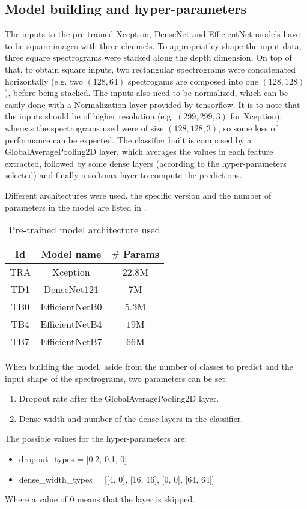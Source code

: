 \subsection{Model building and hyper-parameters}

The inputs to the pre-trained Xception, DenseNet and EfficientNet models have
to be square images with three channels.
To appropriatley shape the input data, three square spectrograms were stacked
along the depth dimension.
On top of that, to obtain square inputs, two rectangular spectrograms were
concatenated horizontally (e.g. two $\left( 128, 64 \right)$ spectrogams are
composed into one $\left( 128, 128 \right)$), before being stacked.
The inputs also need to be normalized, which can be easily done with a
Normalization layer provided by tensorflow.
It is to note that the inputs should be of higher resolution (e.g. $\left( 299,
299, 3 \right)$ for Xception), whereas the spectrograms used were of size
$\left( 128, 128, 3 \right)$, so some loss of performance can be expected.
The classifier built is composed by a GlobalAveragePooling2D layer, which
averages the values in each feature extracted, followed by some dense layers
(according to the hyper-parameters selected) and finally a softmax layer to
compute the predictions.

Different architectures were used, the specific version and the number of 
parameters in the model are listed in .
\begin{table}[ht!]
    \centering
    \caption{Pre-trained model architecture used}
    \label{tab:transfer_models_list}
    \begin{tabular}{|c|c|c|}
        \hline
        Id & Model name & $\#$ Params \\
        \hline
        TRA & Xception        & $22.8$M \\
        TD1 & DenseNet121     & $7$M    \\
        TB0 & EfficientNetB0  & $5.3$M  \\
        TB4 & EfficientNetB4  & $19$M   \\
        TB7 & EfficientNetB7  & $66$M   \\
        \hline
    \end{tabular}
\end{table}

When building the model, aside from the number of classes to predict and the
input shape of the spectrograms, two parameters can be set:
\begin{enumerate}
    \item Dropout rate after the GlobalAveragePooling2D layer.
    \item Dense width and number of the dense layers in the classifier.
\end{enumerate}
The possible values for the hyper-parameters are:
\begin{itemize}
    \item dropout\_types = [0.2, 0.1, 0]
    \item dense\_width\_types = [[4, 0], [16, 16], [0, 0], [64, 64]]
\end{itemize}
Where a value of $0$ means that the layer is skipped.

